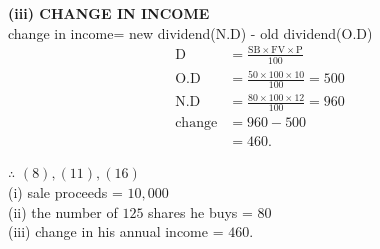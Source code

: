 \documentclass[journal,12pt,twocolumn]{IEEEtran}
\begin{document}
\medskip

\textbf{(iii) CHANGE IN INCOME}\\
change in income= new dividend(N.D) - old dividend(O.D)\\
\begin{align}
\text{D}&=\frac{\text{SB} \times \text{FV} \times \text{P}}{100}\\
\text{O.D}&=\frac{50 \times 100 \times 10}{100} =500\\
\text{N.D}&=\frac{80 \times 100 \times 12}{100} =960\\
\text{change}&=960-500\\
&=460.
\end{align}


\hspace{1cm}$\therefore$  $ (8),(11),(16)$\\
\hspace*{1cm} (i) sale proceeds = \rupee$10,000$\\
\hspace*{1cm} (ii) the number of \rupee$125$ shares he buys = $80$\\
\hspace*{1cm} (iii) change in his annual income = \rupee$460$.\\
\end{document}
